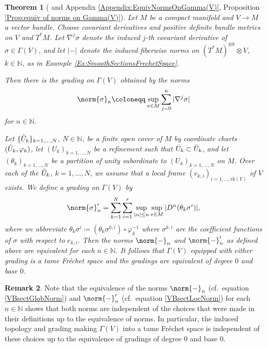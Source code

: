 \documentclass[12pt,a4paper]{article}
\theoremstyle{plain}
\newtheorem{theorem}{Theorem}[subsection]
\theoremstyle{definition}
\newtheorem{remark}[theorem]{Remark}
\newcommand{\N}{\mathbb{N}}
\newcommand{\nnorm}[2]{\norm{#1}_{#2}}
\newcommand{\tens}{\otimes}
\begin{document}
\begin{theorem}[{\cite[Part II, Corollary 1.3.9]{hamilton} and Appendix \ref{Appendix:EquivNormsOnGamma(V)}, Proposition \ref{Prop:equiv of norms on Gamma(V)}}]
\label{VBsectTameFre}
Let $M$ be a compact manifold and $V\to M$ a vector bundle. Choose covariant derivatives and positive definite bundle metrics on $V$ and $T^*M$. Let $\nabla^j\sigma$ denote the induced $j$-th covariant derivative of $\sigma\in \Gamma(V)$, and let $|-|$ denote the induced fiberwise norms on $(T^*M)^{\tens k}\tens V$, $k\in \N$, as in Example \ref{Ex:SmoothSectionsFrechetSpace}.

Then there is the grading on $\Gamma(V)$ obtained by the norms
\begin{align}
\label{VBsectGlobNorm}
    \nnorm{\sigma}{n}\coloneqq \sup_{x\in M}\sum_{j=0}^n|\nabla^j\sigma|
\end{align}
for $n\in \N$.


Let $\{\Tilde{U}_k\}_{k=1,\ldots,N}$, $N\in \N$, be a finite open cover of $M$ by coordinate charts $(\Tilde{U}_k,\varphi_k)$, let $(U_k)_{k=1,\ldots,N}$ be a refinement such that $\Bar{U}_k\subset \Tilde{U}_k$, and let $(\theta_k)_{k=1,\ldots,N}$ be a partition of unity subordinate to $(U_k)_{k=1,\ldots,N}$ on $M$. Over each of the $\Tilde{U}_k$, $k=1,\ldots,N$, we assume that a local frame $(e_{k,i})_{i=1,\ldots,\mathrm{rk}(V)}$ of $V$ exists. We define a grading on $\Gamma(V)$ by 
\begin{equation}
\label{VBsectLocNorm}
    \nnorm{\sigma}{n}'=\sum_{k=1}^N\sum_{i=1}^r\sup_{|\alpha|\leq n}\sup_{x\in M}|D^{\alpha}(\theta_k\sigma^i)|,
\end{equation}
where we abbreviate $\theta_k\sigma^i\coloneqq (\theta_k\sigma^{k,i})\circ\varphi_k^{-1}$ where $\sigma^{k,i}$ are the coefficient functions of $\sigma$ with respect to $e_{k,i}$.
Then the norms $\nnorm{-}{n}$ and $\nnorm{-}{n}'$ as defined above are equivalent for each $n\in \N$. It follows that $\Gamma(V)$ equipped with either grading is a tame Fréchet space and the gradings are equivalent of degree $0$ and base $0$.
\end{theorem}


\begin{remark}
\label{Rem:NormsOnSectOfVBIndepOfChoices}
Note that the equivalence of the norms $\nnorm{-}{n}$ (cf.~equation \eqref{VBsectGlobNorm}) and $\nnorm{-}{n}'$ (cf.~equation \eqref{VBsectLocNorm}) for each $n\in \N$ shows that both norms are independent of the choices that were made in their definitions up to the equivalence of norms. In particular, the induced topology and grading making $\Gamma(V)$ into a tame Fréchet space is independent of these choices up to the equivalence of gradings of degree $0$ and base $0$.
\end{remark}
\end{document}
